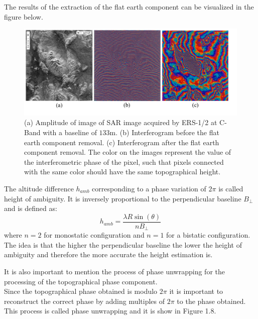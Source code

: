 The results of the extraction of the flat earth component can be visualized in the figure below.
\begin{figure}[H]
    \centering
    \includegraphics[width=\linewidth]{Cap1/flat_interf.png}
    \caption{(a) Amplitude of image of SAR image acquired by ERS-1/2 at C-Band with a baseline of $133$m.
    (b) Interferogram before the flat earth component removal. (c) Interferogram after the flat earth component removal. The color on the images represent the value of the interferometric phase of the pixel, such that pixels connected with the same color should have the same topographical height. \cite{Paolathesis}}
    \label{fig:flat_earth_removal}
\end{figure}


The altitude difference $h_{amb}$ corresponding to a phase variation of $2\pi$ is called height of ambiguity. It is inversely proportional to the perpendicular baseline $B_{\perp}$ and is defined as:
\begin{equation}
    h_{amb} = \frac{\lambda R \sin(\theta)}{nB_{\perp}}
\end{equation}
where $n=2$ for monostatic configuration and $n=1$ for a bistatic configuration.
The idea is that the higher the perpendicular baseline the lower the height of ambiguity and therefore the more accurate the height estimation is.

It is also important to mention the process of phase unwrapping for the processing of the topographical phase component.\\
Since the topographical phase obtained is modulo $2\pi$ it is important to reconstruct the correct phase by adding multiples of $2\pi$ to the phase obtained. 
This process is called phase unwrapping and it is show in Figure 1.8.

